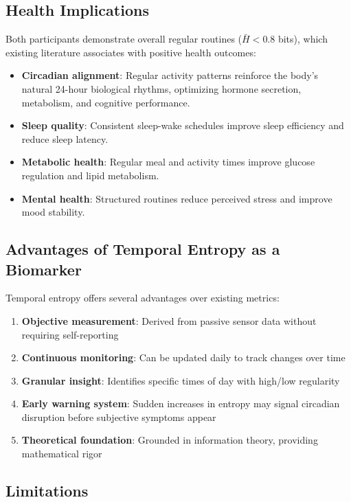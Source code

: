 \documentclass[12pt,letterpaper]{article}
\begin{document}
\subsection{Health Implications}

Both participants demonstrate overall regular routines ($\bar{H} < 0.8$ bits), which existing literature associates with positive health outcomes:

\begin{itemize}
    \item \textbf{Circadian alignment}: Regular activity patterns reinforce the body's natural 24-hour biological rhythms, optimizing hormone secretion, metabolism, and cognitive performance.
    \item \textbf{Sleep quality}: Consistent sleep-wake schedules improve sleep efficiency and reduce sleep latency.
    \item \textbf{Metabolic health}: Regular meal and activity times improve glucose regulation and lipid metabolism.
    \item \textbf{Mental health}: Structured routines reduce perceived stress and improve mood stability.
\end{itemize}

\subsection{Advantages of Temporal Entropy as a Biomarker}

Temporal entropy offers several advantages over existing metrics:

\begin{enumerate}
    \item \textbf{Objective measurement}: Derived from passive sensor data without requiring self-reporting
    \item \textbf{Continuous monitoring}: Can be updated daily to track changes over time
    \item \textbf{Granular insight}: Identifies specific times of day with high/low regularity
    \item \textbf{Early warning system}: Sudden increases in entropy may signal circadian disruption before subjective symptoms appear
    \item \textbf{Theoretical foundation}: Grounded in information theory, providing mathematical rigor
\end{enumerate}

\subsection{Limitations}
\end{document}
